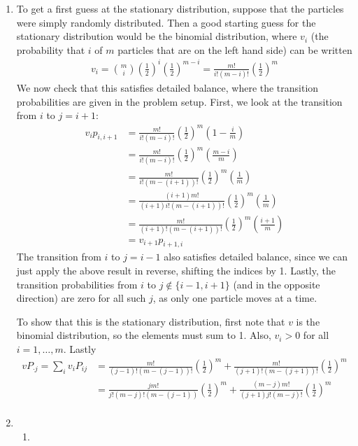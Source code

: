 \documentclass[12pt]{article}
\theoremstyle{plain}
\theoremstyle{definition}
\theoremstyle{remark}
\begin{document}
\begin{enumerate}
\item %
  To get a first guess at the stationary distribution, suppose that the
  particles were simply randomly distributed. Then a good starting guess
  for the stationary distribution would be the binomial distribution,
  where $v_i$ (the probability that $i$ of $m$ particles that are on the
  left hand side) can be written
  \begin{align}
    v_i = \binom{m}{i} \left(\frac{1}{2}\right)^i
      \left(\frac{1}{2}\right)^{m-i} =
      \frac{m!}{i!(m-i)!} \left(\frac{1}{2}\right)^m
      \label{q3.v}
  \end{align}
  We now check that this satisfies detailed balance, where the
  transition probabilities are given in the problem setup. First, we
  look at the transition from $i$ to $j=i+1$:
  \begin{align*}
    v_i p_{i,i+1}
      &= \frac{m!}{i!(m-i)!} \left(\frac{1}{2}\right)^m
        \left(1-\frac{i}{m}\right)\\
      &= \frac{m!}{i!(m-i)!} \left(\frac{1}{2}\right)^m
        \left(\frac{m-i}{m}\right)\\
      &= \frac{m!}{i!(m-(i+1))!} \left(\frac{1}{2}\right)^m
        \left(\frac{1}{m}\right)\\
      &= \frac{(i+1)m!}{(i+1)i!(m-(i+1))!} \left(\frac{1}{2}\right)^m
        \left(\frac{1}{m}\right)\\
      &= \frac{m!}{(i+1)!(m-(i+1))!} \left(\frac{1}{2}\right)^m
        \left(\frac{i+1}{m}\right)\\
      &= v_{i+1} p_{i+1,i}
  \end{align*}
  The transition from $i$ to $j=i-1$ also satisfies detailed balance,
  since we can just apply the above result in reverse, shifting the
  indices by 1. Lastly, the transition probabilities from $i$ to
  $j\not\in\{i-1,i+1\}$ (and in the opposite direction) are zero for all
  such $j$, as only one particle moves at a time.

  To show that this is the stationary distribution, first note that $v$
  is the binomial distribution, so the elements must sum to 1. Also,
  $v_i>0$ for all $i=1,\ldots,m$. Lastly
  \begin{align*}
    v P_{\cdot j} = \sum_i v_i P_{ij} &=
      \frac{m!}{(j-1)!(m-(j-1))!} \left(\frac{1}{2}\right)^m
      +
      \frac{m!}{(j+1)!(m-(j+1))!} \left(\frac{1}{2}\right)^m\\
    &=
      \frac{j m!}{j!(m-j)!(m-(j-1))} \left(\frac{1}{2}\right)^m
      +
      \frac{(m-j)m!}{(j+1)j!(m-j)!} \left(\frac{1}{2}\right)^m\\
  \end{align*}


\item %
  \begin{enumerate} %
    \item
  \end{enumerate}

\end{enumerate}



\end{document}

